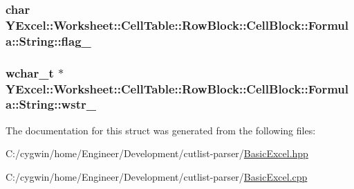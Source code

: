 \subsubsection[{flag\+\_\+}]{\setlength{\rightskip}{0pt plus 5cm}char Y\+Excel\+::\+Worksheet\+::\+Cell\+Table\+::\+Row\+Block\+::\+Cell\+Block\+::\+Formula\+::\+String\+::flag\+\_\+}\label{struct_y_excel_1_1_worksheet_1_1_cell_table_1_1_row_block_1_1_cell_block_1_1_formula_1_1_string_ae95881d5021565f9b7ee07035039e88e}
\hypertarget{struct_y_excel_1_1_worksheet_1_1_cell_table_1_1_row_block_1_1_cell_block_1_1_formula_1_1_string_a9f77f390496c5b4248f261ef541f56cd}{}
\subsubsection[{wstr\+\_\+}]{\setlength{\rightskip}{0pt plus 5cm}wchar\+\_\+t $\ast$ Y\+Excel\+::\+Worksheet\+::\+Cell\+Table\+::\+Row\+Block\+::\+Cell\+Block\+::\+Formula\+::\+String\+::wstr\+\_\+}\label{struct_y_excel_1_1_worksheet_1_1_cell_table_1_1_row_block_1_1_cell_block_1_1_formula_1_1_string_a9f77f390496c5b4248f261ef541f56cd}


The documentation for this struct was generated from the following files\+:\begin{DoxyCompactItemize}
\item 
C\+:/cygwin/home/\+Engineer/\+Development/cutlist-\/parser/\hyperlink{_basic_excel_8hpp}{Basic\+Excel.\+hpp}\item 
C\+:/cygwin/home/\+Engineer/\+Development/cutlist-\/parser/\hyperlink{_basic_excel_8cpp}{Basic\+Excel.\+cpp}\end{DoxyCompactItemize}
